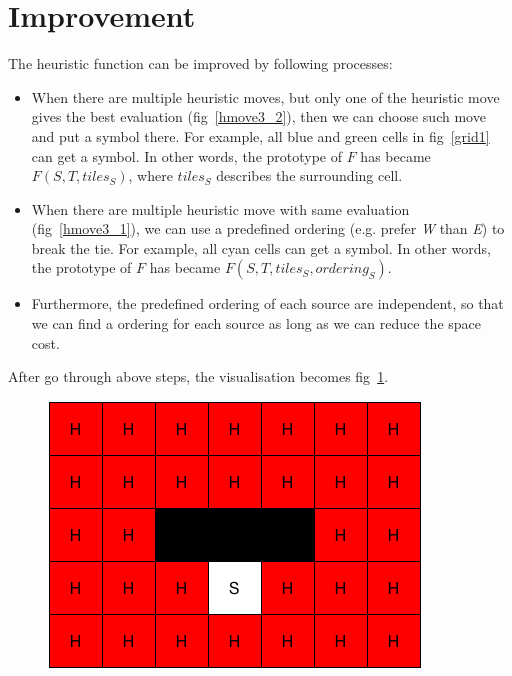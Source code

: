 \section{Improvement}
The heuristic function can be improved by following processes:
\begin{itemize}
  \item When there are multiple heuristic moves, but only one of the heuristic
    move gives the best evaluation (fig~\ref{hmove3_2}), then we can choose such move and put a \heur{}
    symbol there. For example, all blue and green cells in fig~\ref{grid1} can get a \heur{} symbol.
    In other words, the prototype of $F$ has became $F(S, T, tiles_S)$, where
    $tiles_S$ describes the surrounding cell.

  \item When there are multiple heuristic move with same evaluation (fig~\ref{hmove3_1}), we
    can use a predefined ordering (e.g. prefer \textit{W} than \textit{E}) to break the tie. For example, all cyan cells can get
    a \heur{} symbol. In other words, the prototype of $F$ has became $F(S, T, tiles_S, ordering_S)$.

  \item Furthermore, the predefined ordering of each source are independent, so that we can
    find a ordering for each source as long as we can reduce the space cost.

\end{itemize}

After go through above steps, the visualisation becomes fig~\ref{grid2}.

\begin{figure}[t]
  \centering
  \includegraphics[width=.5\columnwidth]{./grid2.png}
  \caption{}
  \label{grid2}
\end{figure}
